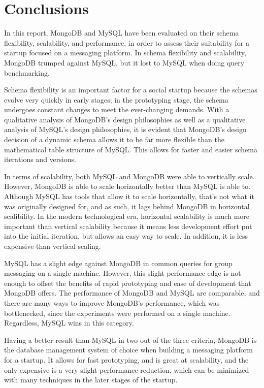 \documentclass[12pt]{article}
\begin{document}
\section{Conclusions}
In this report, MongoDB and MySQL have been evaluated on their schema flexibility, scalability, and performance, in order to assess their suitability for a startup focused on a messaging platform. In schema flexibility and scalability, MongoDB trumped against MySQL, but it lost to MySQL when doing query benchmarking. 

Schema flexibility is an important factor for a social startup because the schemas evolve very quickly in early stages; in the prototyping stage, the schema undergoes constant changes to meet the ever-changing demands. With a qualitative analysis of MongoDB's design philosophies as well as a qualitative analysis of MySQL's design philosophies, it is evident that MongoDB's design decision of a dynamic schema allows it to be far more flexible than the mathematical table structure of MySQL. This allows for faster and easier schema iterations and versions.

In terms of scalability, both MySQL and MongoDB were able to vertically scale. However, MongoDB is able to scale horizontally better than MySQL is able to. Although MySQL has tools that allow it to scale horizontally, that's not what it was originally designed for, and as such, it lags behind MongoDB in horizontal scalibility. In the modern technological era, horizontal scalability is much more important than vertical scalability because it means less development effort put into the initial iteration, but allows an easy way to scale. In addition, it is less expensive than vertical scaling.

MySQL has a slight edge against MongoDB in common queries for group messaging on a single machine. However, this slight performance edge is not enough to offset the benefits of rapid prototyping and ease of development that MongoDB offers. The performance of MongoDB and MySQL are comparable, and there are many ways to improve MongoDB's performance, which was bottlenecked, since the experiments were performed on a single machine. Regardless, MySQL wins in this category.

Having a better result than MySQL in two out of the three criteria, MongoDB is the database management system of choice when building a messaging platform for a startup. It allows for fast prototyping, and is great at scalability, and the only expensive is a very slight performance reduction, which can be minimized with many techniques in the later stages of the startup.
\end{document}
